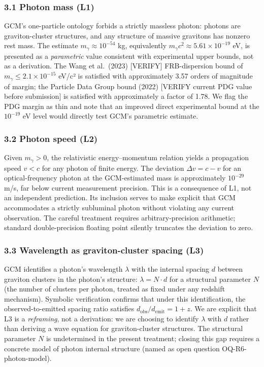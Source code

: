 \documentclass[12pt]{article}
\theoremstyle{definition}
\theoremstyle{remark}
\begin{document}
\subsubsection{3.1 Photon mass (L1)}\label{photon-mass-l1}

GCM's one-particle ontology forbids a strictly massless photon: photons
are graviton-cluster structures, and any structure of massive gravitons
has nonzero rest mass. The estimate \(m_\gamma \approx 10^{-54}\) kg,
equivalently \(m_\gamma c^2 \approx 5.61 \times 10^{-19}\) eV, is
presented as a \emph{parametric} value consistent with experimental
upper bounds, not as a derivation. The Wang et al.~(2023) {[}VERIFY{]}
FRB-dispersion bound of \(m_\gamma \leq 2.1 \times 10^{-15}\) eV/c² is
satisfied with approximately 3.57 orders of magnitude of margin; the
Particle Data Group bound (2022) {[}VERIFY current PDG value before
submission{]} is satisfied with approximately a factor of 1.78. We flag
the PDG margin as thin and note that an improved direct experimental
bound at the \(10^{-19}\) eV level would directly test GCM's parametric
estimate.

\subsubsection{3.2 Photon speed (L2)}\label{photon-speed-l2}

Given \(m_\gamma > 0\), the relativistic energy--momentum relation
yields a propagation speed \(v < c\) for any photon of finite energy.
The deviation \(\Delta v = c - v\) for an optical-frequency photon at
the GCM-estimated mass is approximately \(10^{-29}\) m/s, far below
current measurement precision. This is a consequence of L1, not an
independent prediction. Its inclusion serves to make explicit that GCM
accommodates a strictly subluminal photon without violating any current
observation. The careful treatment requires arbitrary-precision
arithmetic; standard double-precision floating point silently truncates
the deviation to zero.

\subsubsection{3.3 Wavelength as graviton-cluster spacing
(L3)}\label{wavelength-as-graviton-cluster-spacing-l3}

GCM identifies a photon's wavelength \(\lambda\) with the internal
spacing \(d\) between graviton clusters in the photon's structure:
\(\lambda = N \cdot d\) for a structural parameter \(N\) (the number of
clusters per photon, treated as fixed under any redshift mechanism).
Symbolic verification confirms that under this identification, the
observed-to-emitted spacing ratio satisfies
\(d_{\text{obs}}/d_{\text{emit}} = 1+z\). We are explicit that L3 is a
\emph{reframing}, not a derivation: we are choosing to identify
\(\lambda\) with \(d\) rather than deriving a wave equation for
graviton-cluster structures. The structural parameter \(N\) is
undetermined in the present treatment; closing this gap requires a
concrete model of photon internal structure (named as open question
OQ-R6-photon-model).
\end{document}
